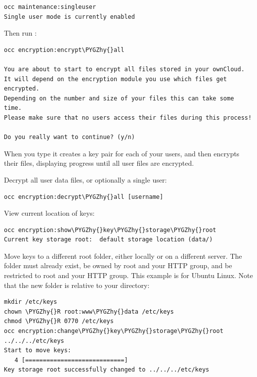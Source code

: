 \documentclass[letterpaper,10pt,english]{sphinxmanual}
\def\PYGZhy{\char`\-}
\begin{document}
\begin{Verbatim}[commandchars=\\\{\}]
occ maintenance:singleuser
Single user mode is currently enabled
\end{Verbatim}

Then run :

\begin{Verbatim}[commandchars=\\\{\}]
occ encryption:encrypt\PYGZhy{}all

You are about to start to encrypt all files stored in your ownCloud.
It will depend on the encryption module you use which files get encrypted.
Depending on the number and size of your files this can take some time.
Please make sure that no users access their files during this process!

Do you really want to continue? (y/n)
\end{Verbatim}

When you type  it creates a key pair for each of your users, and then
encrypts their files, displaying progress until all user files are encrypted.

Decrypt all user data files, or optionally a single user:

\begin{Verbatim}[commandchars=\\\{\}]
occ encryption:decrypt\PYGZhy{}all [username]
\end{Verbatim}

View current location of keys:

\begin{Verbatim}[commandchars=\\\{\}]
occ encryption:show\PYGZhy{}key\PYGZhy{}storage\PYGZhy{}root
Current key storage root:  default storage location (data/)
\end{Verbatim}

Move keys to a different root folder, either locally or on a different server.
The folder must already exist, be owned by root and your HTTP group, and be
restricted to root and your HTTP group. This example is for Ubuntu Linux. Note
that the new folder is relative to your  directory:

\begin{Verbatim}[commandchars=\\\{\}]
mkdir /etc/keys
chown \PYGZhy{}R root:www\PYGZhy{}data /etc/keys
chmod \PYGZhy{}R 0770 /etc/keys
occ encryption:change\PYGZhy{}key\PYGZhy{}storage\PYGZhy{}root ../../../etc/keys
Start to move keys:
   4 [============================]
Key storage root successfully changed to ../../../etc/keys
\end{Verbatim}
\end{document}
